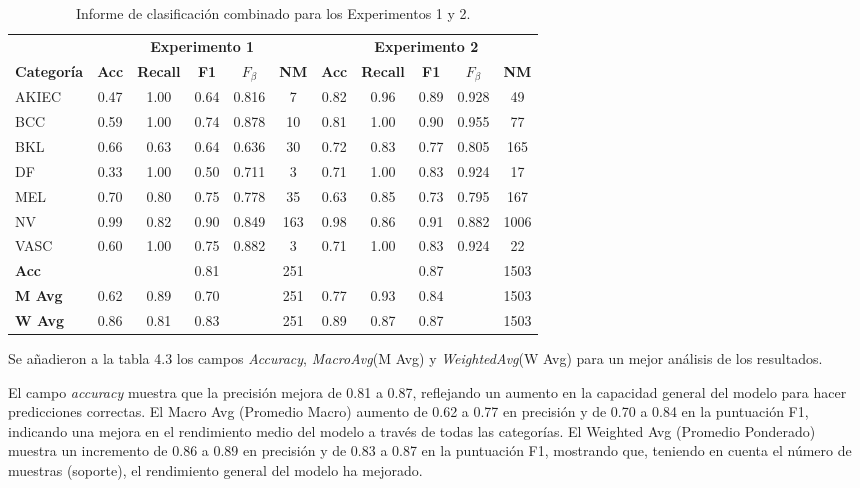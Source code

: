 \begin{table}[ht]
    \small
    \centering
    \caption{Informe de clasificación combinado para los Experimentos 1 y 2.}
    \label{tab:classification_report_combined}
    \begin{tabular}{lcccccccccc}
    \hline
    & \multicolumn{5}{c}{\textbf{Experimento 1}} & \multicolumn{5}{c}{\textbf{Experimento 2}} \\
    \cline{2-10}
    \textbf{Categoría} & \textbf{Acc} & \textbf{Recall} & \textbf{F1} & \textbf{$F_{\beta}$} & \textbf{NM} & \textbf{Acc} & \textbf{Recall} & \textbf{F1} & \textbf{$F_{\beta}$} & \textbf{NM} \\
    \hline
    AKIEC & 0.47 & 1.00 & 0.64 & 0.816 & 7   & 0.82 & 0.96 & 0.89 & 0.928  & 49 \\
    BCC   & 0.59 & 1.00 & 0.74 & 0.878 & 10  & 0.81 & 1.00 & 0.90 &  0.955 & 77 \\
    BKL   & 0.66 & 0.63 & 0.64 & 0.636 & 30  & 0.72 & 0.83 & 0.77 & 0.805  & 165 \\
    DF    & 0.33 & 1.00 & 0.50 & 0.711 & 3   & 0.71 & 1.00 & 0.83 & 0.924  & 17 \\
    MEL   & 0.70 & 0.80 & 0.75 & 0.778 & 35  & 0.63 & 0.85 & 0.73 & 0.795  & 167 \\
    NV    & 0.99 & 0.82 & 0.90 & 0.849 & 163 & 0.98 & 0.86 & 0.91 & 0.882  & 1006 \\
    VASC  & 0.60 & 1.00 & 0.75 & 0.882 & 3   & 0.71 & 1.00 & 0.83 & 0.924  & 22 \\
    \hline
    \textbf{Acc} & & & 0.81 & & 251 & & & 0.87 & & 1503 \\
    \textbf{M Avg} & 0.62 & 0.89 & 0.70 & & 251 & 0.77 & 0.93 & 0.84 & & 1503 \\
    \textbf{W Avg} & 0.86 & 0.81 & 0.83 & & 251 & 0.89 & 0.87 & 0.87 & & 1503 \\
    \hline
    \end{tabular}
\end{table}

Se añadieron a la tabla 4.3 los campos \textit{Accuracy}, \textit{MacroAvg}(M Avg) y \textit{WeightedAvg}(W Avg) para un mejor análisis de los resultados.

El campo \textit{accuracy} muestra que la precisión mejora de 0.81 a 0.87, reflejando un aumento en la capacidad general del modelo para hacer predicciones correctas. El Macro Avg (Promedio Macro) aumento de 0.62 a 0.77 en precisión y de 0.70 a 0.84 en la puntuación F1, indicando una mejora en el rendimiento medio del modelo a través de todas las categorías. El Weighted Avg (Promedio Ponderado) muestra un incremento de 0.86 a 0.89 en precisión y de 0.83 a 0.87 en la puntuación F1, mostrando que, teniendo en cuenta el número de muestras (soporte), el rendimiento general del modelo ha mejorado.

